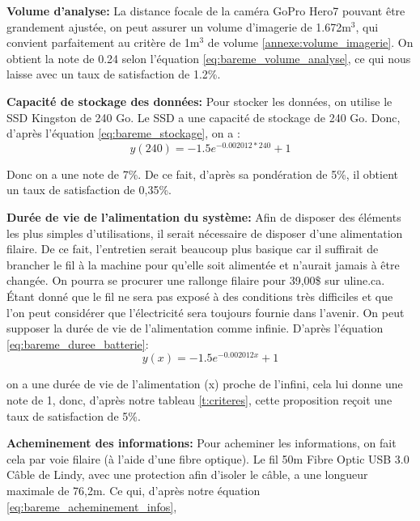 \textbf{Volume d'analyse:} La distance focale de la caméra GoPro Hero7 pouvant être grandement ajustée, on peut assurer un volume d’imagerie de 1.672m$^3$, qui convient parfaitement au critère de 1m$^3$ de volume \ref{annexe:volume_imagerie}.  On obtient la note de 0.24 selon l'équation \ref{eq:bareme_volume_analyse}, ce qui nous laisse avec un taux de satisfaction de 1.2\%.
\vspace{5mm}



\textbf{Capacité de stockage des données:}
Pour stocker les données, on utilise le SSD Kingston de 240 Go. Le SSD a une capacité de stockage de 240 Go. Donc, d'après l'équation \ref{eq:bareme_stockage}, on a :
\begin{equation}
    y(240) = -1.5e^{-0.002012*240} + 1
\end{equation}

Donc on a une note de 7\%. De ce fait, d'après sa pondération de 5\%, il obtient un taux de satisfaction de 0,35\%.
\vspace{5mm}


\textbf{Durée de vie de l'alimentation du système:} Afin de disposer des éléments les plus simples d'utilisations, il serait nécessaire de disposer d'une alimentation filaire. De ce fait, l'entretien serait beaucoup plus basique car il suffirait de brancher le fil à la machine pour qu'elle soit alimentée et n'aurait jamais à être changée. On pourra se procurer une rallonge filaire pour 39,00\$ sur uline.ca. Étant donné que le fil ne sera pas exposé à des conditions très difficiles et que l'on peut considérer que l'électricité sera toujours fournie dans l'avenir. On peut supposer la durée de vie de l'alimentation comme infinie.
D'après l'équation \ref{eq:bareme_duree_batterie}:
\begin{equation}
    y(x) = -1.5e^{-0.002012x} + 1 
        \end{equation}

on a une durée de vie de l'alimentation (x) proche de l'infini, cela lui donne une note de 1, donc, d'après notre tableau \ref{t:criteres}, cette proposition reçoit une taux de satisfaction de 5\%.
\vspace{5mm}


\textbf{Acheminement des informations:}
Pour acheminer les informations, on fait cela par voie filaire (à l'aide d'une fibre optique). Le fil 50m Fibre Optic USB 3.0 Câble de Lindy, avec une protection afin d'isoler le câble, a une longueur maximale de 76,2m. Ce qui, d'après notre équation \ref{eq:bareme_acheminement_infos},

